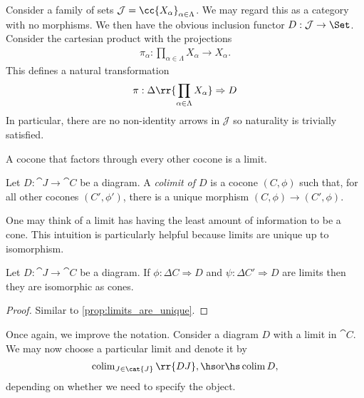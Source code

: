 \documentclass{article}
\begin{document}
\begin{example}
  Consider a family of sets $\mathcal J=\cc{X_\alpha}_{\alpha\in\Lambda}$. We may
  regard this as a category with no morphisms. We then have
  the obvious inclusion functor $D:\mathcal J\to\Set$. Consider the cartesian
  product with the projections
  \begin{align*}
    \pi_\alpha : \prod_{\alpha\in\Lambda} X_\alpha \to X_\alpha.
  \end{align*}
  This defines a natural transformation
  \begin{align*}
    \pi : \Delta\rr{\prod_{\alpha\in\Lambda} X_\alpha}\Rightarrow D
  \end{align*}
  In particular, there are no non-identity arrows in $\mathcal J$ so
  naturality is trivially satisfied.
\end{example}

A cocone that factors through every other cocone is a limit.

\begin{definition}
  Let $D:\cat{J}\to\cat{C}$ be a diagram. A \emph{colimit of $D$} is a cocone
  $(C,\phi)$ such that, for all other cocones $(C',\phi')$, there is a unique morphism
  $(C,\phi)\to(C',\phi)$.
\end{definition}

One may think of a limit has having the least amount of information to be a cone.
This intuition is particularly helpful because limits are unique up to isomorphism.

\begin{proposition}
  Let $D:\cat{J}\to\cat{C}$ be a diagram. If $\phi:\Delta C\Rightarrow D$
  and $\psi:\Delta C'\Rightarrow D$ are limits then they are isomorphic as cones.
  \begin{proof}
    Similar to \ref{prop:limits_are_unique}.
  \end{proof}
\end{proposition}

\begin{notation}
  Once again, we improve the notation. Consider a diagram
  $D$ with a limit in $\cat{C}$. We may now choose a particular limit and denote
  it by
  \begin{align*}
    \colim_{J\in\cat{J}}\rr{DJ},\hs\text{or}\hs\colim D,
  \end{align*}
  depending on whether we need to specify the object.
\end{notation}
\end{document}
